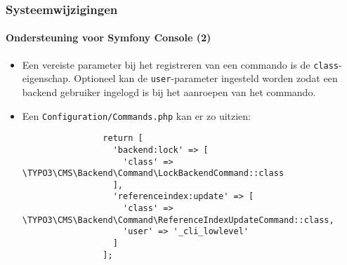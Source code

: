 \begin{frame}[fragile]
	\frametitle{Systeemwijzigingen}
	\framesubtitle{Ondersteuning voor Symfony Console (2)}

	\lstset{basicstyle=\tiny\ttfamily}

	\begin{itemize}

		\item Een vereiste parameter bij het registreren van een commando is de \texttt{class}-eigenschap.
			Optioneel kan de \texttt{user}-parameter ingesteld worden zodat een backend gebruiker ingelogd
			is bij het aanroepen van het commando.

		\item Een \texttt{Configuration/Commands.php} kan er zo uitzien:

			\begin{lstlisting}
				return [
				  'backend:lock' => [
				    'class' => \TYPO3\CMS\Backend\Command\LockBackendCommand::class
				  ],
				  'referenceindex:update' => [
				    'class' => \TYPO3\CMS\Backend\Command\ReferenceIndexUpdateCommand::class,
				    'user' => '_cli_lowlevel'
				  ]
				];
			\end{lstlisting}

	\end{itemize}

\end{frame}

